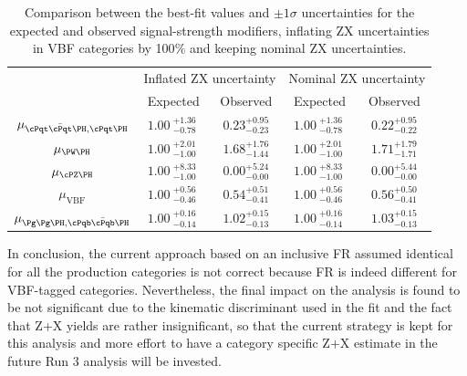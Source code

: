 \begin{table}[!h]
        \begin{center}
                \caption{
                Comparison between the best-fit values and $\pm 1\sigma$ uncertainties for the expected and observed signal-strength modifiers,
                inflating ZX uncertainties in VBF categories by 100$\%$ and keeping nominal ZX uncertainties.
                \label{tab:inflatedMu}
                        }
    \renewcommand{\arraystretch}{1.5}
    \begin{tabular}{c|cc|cc}
        & \multicolumn{2}{c|}{Inflated ZX uncertainty} & \multicolumn{2}{c}{Nominal ZX uncertainty} \\
        & Expected  & Observed & Expected & Observed \\
        \hline
        $\mu_{\ttH,\tH}$       & $1.00~^{+1.36}_{-0.78}~$ & $0.23 ^{+0.95}_{-0.23}$   & $1.00~^{+1.36}_{-0.78}~$ & $0.22 ^{+0.95}_{-0.22}$ \\
        $\mu_{\WH}$            & $1.00~^{+2.01}_{-1.00}~$ & $1.68 ^{+1.76}_{-1.44}$   & $1.00~^{+2.01}_{-1.00}~$ & $1.71 ^{+1.79}_{-1.71}$ \\
        $\mu_{\ZH}$            & $1.00~^{+8.33}_{-1.00}~$ & $0.00 ^{+5.24}_{-0.00}$   & $1.00~^{+8.33}_{-1.00}~$ & $0.00 ^{+5.44}_{-0.00}$ \\
        $\mu_{\mathrm{VBF}}$   & $1.00~^{+0.56}_{-0.46}~$ & $0.54 ^{+0.51}_{-0.41}$   & $1.00~^{+0.56}_{-0.46}~$ & $0.56 ^{+0.50}_{-0.41}$ \\
        $\mu_{\Pg\Pg\PH,\bbH}$ & $1.00~^{+0.16}_{-0.14}~$ & $1.02 ^{+0.15}_{-0.13}$   & $1.00~^{+0.16}_{-0.14}~$ & $1.03 ^{+0.15}_{-0.13}$ \\
        \hline
\end{tabular}
        \end{center}
\end{table}



In conclusion, the current approach based on an inclusive FR assumed identical for all the production categories is not correct because FR is indeed different for VBF-tagged categories. 
Nevertheless, the final impact on the analysis is found to be not significant due to the kinematic discriminant used in the fit and the fact that Z+X yields
are rather insignificant, so that the current strategy is kept for this analysis and more effort to have a category specific Z+X estimate in the future Run 3 analysis will be invested.
